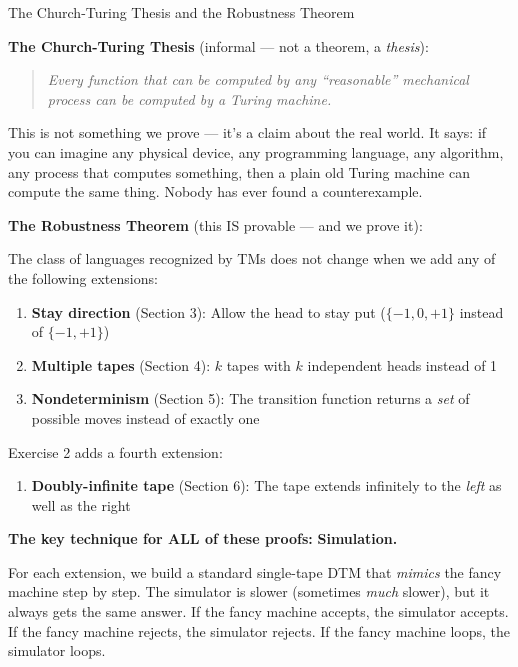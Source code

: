 \begin{conceptbox}{The Church-Turing Thesis and the Robustness Theorem}

\textbf{The Church-Turing Thesis} (informal --- not a theorem, a \textit{thesis}):

\begin{quote}
\textit{Every function that can be computed by any ``reasonable'' mechanical process can be computed by a Turing machine.}
\end{quote}

This is not something we prove --- it's a claim about the real world. It says: if you can imagine any physical device, any programming language, any algorithm, any process that computes something, then a plain old Turing machine can compute the same thing. Nobody has ever found a counterexample.

\textbf{The Robustness Theorem} (this IS provable --- and we prove it):

The class of languages recognized by TMs does not change when we add any of the following extensions:
\begin{enumerate}[nosep]
\item \textbf{Stay direction} (Section 3): Allow the head to stay put ($\{-1, 0, +1\}$ instead of $\{-1, +1\}$)
\item \textbf{Multiple tapes} (Section 4): $k$ tapes with $k$ independent heads instead of 1
\item \textbf{Nondeterminism} (Section 5): The transition function returns a \textit{set} of possible moves instead of exactly one
\end{enumerate}

Exercise 2 adds a fourth extension:
\begin{enumerate}[nosep, start=4]
\item \textbf{Doubly-infinite tape} (Section 6): The tape extends infinitely to the \textit{left} as well as the right
\end{enumerate}

\textbf{The key technique for ALL of these proofs:} \textbf{Simulation.}

For each extension, we build a standard single-tape DTM that \textit{mimics} the fancy machine step by step. The simulator is slower (sometimes \textit{much} slower), but it always gets the same answer. If the fancy machine accepts, the simulator accepts. If the fancy machine rejects, the simulator rejects. If the fancy machine loops, the simulator loops.

\end{conceptbox}

